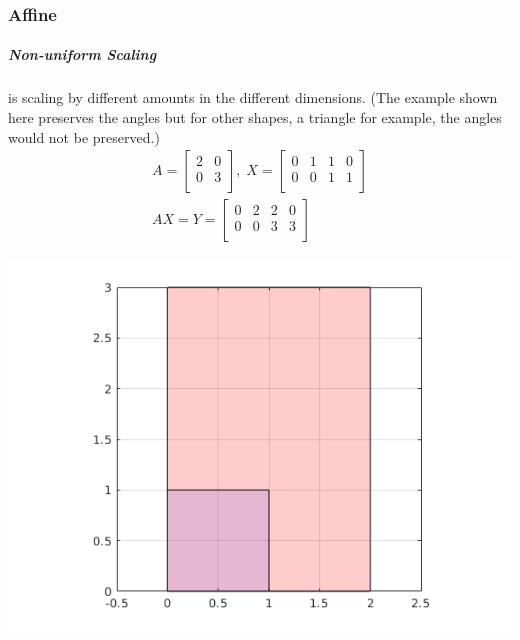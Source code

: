 \documentclass[MathsNotesBase.tex]{subfiles}
\begin{document}
{		\subsubsection{Affine}
		\subparagraph{Non-uniform Scaling} is scaling by different amounts in the different dimensions. (The example shown here preserves the angles but for other shapes, a triangle for example, the angles would not be preserved.)
		\begin{align*}
		A =
		\begin{bmatrix}    
		2  &  0 \\
		0  &  3 \\		
		\end{bmatrix}
		,\; X = 
		\begin{bmatrix}  
		0   &  1  &   1  &   0 \\
		0   &  0  &   1  &   1	\\	
		\end{bmatrix} \\[10pt]
		AX = Y = 
		\begin{bmatrix}   
		0  &   2  &  2  &  0 \\
		0  &   0  &  3  &  3 \\
		\end{bmatrix}
		\end{align*}
	
		\begin{center}
		\includegraphics[scale=0.85]{resources/img/GeometryOfMatrices_images/non_uniform_scaling.png}
		\end{center}
		
}
\end{document}
